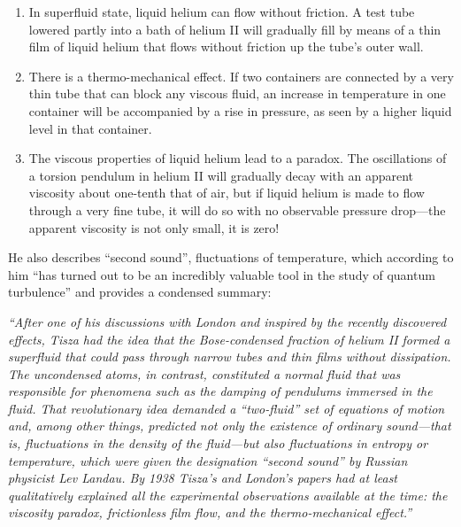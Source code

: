 \documentclass[a4paper]{article}
\newcommand\textstyleNone[1]{#1}
\begin{document}
\begin{enumerate}
\item {\color[rgb]{0.101960786,0.101960786,0.101960786}
\textstyleNone{In superfluid state, liquid helium can flow without friction. A test tube lowered partly into a bath of
helium II will gradually fill by means of a thin film of liquid helium that flows without friction up the tube's outer
wall.}}
\item {\color[rgb]{0.101960786,0.101960786,0.101960786}
\textstyleNone{There is a thermo-mechanical effect. If two containers are connected by a very thin tube that can block
any viscous fluid, an increase in temperature in one container will be accompanied by a rise in pressure, as seen by a
higher liquid level in that container.}}
\item {\color[rgb]{0.101960786,0.101960786,0.101960786}
\textstyleNone{The viscous properties of liquid helium lead to a paradox. The oscillations of a torsion pendulum in
helium II will gradually decay with an apparent viscosity about one-tenth that of air, but if liquid helium is made to
flow through a very fine tube, it will do so with no observable pressure drop---the apparent viscosity is not only
small, it is zero!}}
\end{enumerate}
{\color[rgb]{0.101960786,0.101960786,0.101960786}
\textstyleNone{He also describes ``second sound'', fluctuations of temperature, which according to him ``has turned out
to be an incredibly valuable tool in the study of quantum turbulence'' and provides a condensed summary:}}

{\color[rgb]{0.101960786,0.101960786,0.101960786}
\textstyleNone{\textit{{}``After one of his discussions with London and inspired by the recently discovered effects,
Tisza had the idea that the Bose-condensed fraction of helium II formed a superfluid that could pass through narrow
tubes and thin films withou}\textit{t dissipation. The uncondensed atoms, in contrast, constituted a normal fluid that
was responsible for phenomena such as the damping of pendulums immersed in the fluid. That revolutionary idea demanded
a ``two-fluid'' set of equations of motion and, among other things, predicted not only the existence of ordinary
sound---that is, fluctuations in the density of the fluid---but also fluctuations in entropy or temperature, which were
given the designation ``second sound'' by Russian physicist Lev Landau. By 1938 Tisza's and London's papers had at
least qualitatively explained all the experimental observations available at the time: the viscosity paradox,
frictionless film flow, and the thermo-mechanical effect.''}}}
\end{document}

